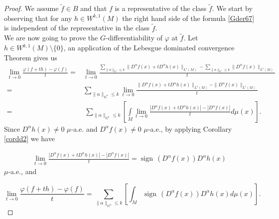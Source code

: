 \documentclass[a4paper,12pt,reqno]{amsart}%
\theoremstyle{definition}
\numberwithin{equation}{section}
\numberwithin{theorem}{section}
\DeclareMathOperator*{\sign}{sign\,}
\begin{document}
\begin{proof} %

We assume $\tilde{f}\in B$ and that $f$ is a representative of the class $\tilde{f}$. We start by observing that for any $h\in  W^{k,1}(M)$ the right hand side of the  formula \eqref{Gder67} is independent of the representative in the class $\tilde{f}$. \\
	
We are now going to prove the $G$-differentiability of $\varphi$ at $\tilde{f}$. Let $h\in  W^{k,1}(M)\setminus\{0\}$, an application of the  Lebesgue dominated convergence Theorem gives us
{\setlength\arraycolsep{0pt}
\begin{align*}
	\lim\limits_{t\rightarrow 0}\frac{\varphi(f+th)-\varphi(f)}{t}=& \lim\limits_{t\rightarrow 0} \frac{\sum\limits_{\|\alpha\|_{\mathbb{N}^{n}}\leq k}  \|D^{\alpha}f(x)+tD^{\alpha}h(x)\|_{L^{1}(M)}-\sum\limits_{\|\alpha\|_{\mathbb{N}^{n}}\leq k}  \|D^{\alpha}f(x)\|_{L^{1}(M)}}{t}\\
=&\sum\limits_{\|\alpha\|_{\mathbb{N}^{n}}\leq k}\lim\limits_{t\rightarrow 0}\frac{  \|D^{\alpha}f(x)+tD^{\alpha}h(x)\|_{L^{1}(M)}-  \|D^{\alpha}f(x)\|_{L^{1}(M)}}{t}\\
=&\ \sum\limits_{\|\alpha\|_{\mathbb{N}^{n}}\leq k}\left[  \int\limits_{M}\lim\limits_{t\rightarrow 0}\frac{  |D^{\alpha}f(x)+tD^{\alpha}h(x)|-|D^{\alpha}f(x)|}{t}d\mu(x)\right].
	 	\end{align*}} 
Since $D^{\alpha}h(x)\neq 0$ $\mu$-a.e. and  $D^{\alpha}f(x)\neq 0$ $\mu$-a.e., by applying Corollary \ref{cordd2} we have

	\begin{align*}
\lim\limits_{t\rightarrow 0}\frac{  |D^{\alpha}f(x)+tD^{\alpha}h(x)|-|D^{\alpha}f(x)|}{t}=\sign(D^{\alpha}f(x))D^{\alpha}h(x)
	\end{align*}
$\mu$-a.e., and

 \[\lim\limits_{t\rightarrow 0}\frac{\varphi(f+th)-\varphi(f)}{t}=\sum\limits_{\|\alpha\|_{\mathbb{N}^{n}}\leq k}\left[ \int_{M  } \sign(D^{\alpha}f(x))D^{\alpha}h(x) d\mu(x)\right].\]
	

\end{proof}
\end{document}
